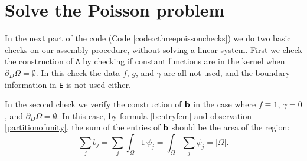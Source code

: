 \section{Solve the Poisson problem}







In the next part of the code (Code \ref{code:cthreepoissonchecks}) we do two basic checks on our assembly procedure, without solving a linear system.  First we check the construction of \texttt{A} by checking if constant functions are in the kernel when $\partial_D\Omega=\emptyset$.  In this check the data $f$, $g$, and $\gamma$ are all not used, and the boundary information in \texttt{E} is not used either.


In the second check we verify the construction of $\mathbf{b}$ in the case where $f\equiv 1$, $\gamma=0$, and $\partial_D\Omega=\emptyset$.  In this case, by formula \eqref{bentryfem} and observation \eqref{partitionofunity}, the sum of the entries of $\mathbf{b}$ should be the area of the region:
   $$\sum_j b_j = \sum_j \int_\Omega 1\, \psi_j = \int_\Omega \sum_j \psi_j = |\Omega|.$$

